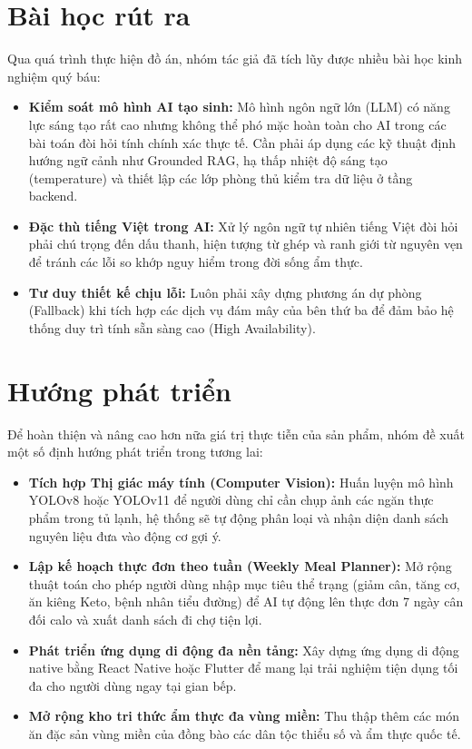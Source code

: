 \section{Bài học rút ra}

Qua quá trình thực hiện đồ án, nhóm tác giả đã tích lũy được nhiều bài học kinh nghiệm quý báu:
\begin{itemize}[leftmargin=1.6em, itemsep=2pt]
  \item \textbf{Kiểm soát mô hình AI tạo sinh:} Mô hình ngôn ngữ lớn (LLM) có năng lực sáng tạo rất cao nhưng không thể phó mặc hoàn toàn cho AI trong các bài toán đòi hỏi tính chính xác thực tế. Cần phải áp dụng các kỹ thuật định hướng ngữ cảnh như Grounded RAG, hạ thấp nhiệt độ sáng tạo (temperature) và thiết lập các lớp phòng thủ kiểm tra dữ liệu ở tầng backend.
  \item \textbf{Đặc thù tiếng Việt trong AI:} Xử lý ngôn ngữ tự nhiên tiếng Việt đòi hỏi phải chú trọng đến dấu thanh, hiện tượng từ ghép và ranh giới từ nguyên vẹn để tránh các lỗi so khớp nguy hiểm trong đời sống ẩm thực.
  \item \textbf{Tư duy thiết kế chịu lỗi:} Luôn phải xây dựng phương án dự phòng (Fallback) khi tích hợp các dịch vụ đám mây của bên thứ ba để đảm bảo hệ thống duy trì tính sẵn sàng cao (High Availability).
\end{itemize}

\section{Hướng phát triển}

Để hoàn thiện và nâng cao hơn nữa giá trị thực tiễn của sản phẩm, nhóm đề xuất một số định hướng phát triển trong tương lai:
\begin{itemize}[leftmargin=1.6em, itemsep=2pt]
  \item \textbf{Tích hợp Thị giác máy tính (Computer Vision):} Huấn luyện mô hình YOLOv8 hoặc YOLOv11 để người dùng chỉ cần chụp ảnh các ngăn thực phẩm trong tủ lạnh, hệ thống sẽ tự động phân loại và nhận diện danh sách nguyên liệu đưa vào động cơ gợi ý.
  \item \textbf{Lập kế hoạch thực đơn theo tuần (Weekly Meal Planner):} Mở rộng thuật toán cho phép người dùng nhập mục tiêu thể trạng (giảm cân, tăng cơ, ăn kiêng Keto, bệnh nhân tiểu đường) để AI tự động lên thực đơn 7 ngày cân đối calo và xuất danh sách đi chợ tiện lợi.
  \item \textbf{Phát triển ứng dụng di động đa nền tảng:} Xây dựng ứng dụng di động native bằng React Native hoặc Flutter để mang lại trải nghiệm tiện dụng tối đa cho người dùng ngay tại gian bếp.
  \item \textbf{Mở rộng kho tri thức ẩm thực đa vùng miền:} Thu thập thêm các món ăn đặc sản vùng miền của đồng bào các dân tộc thiểu số và ẩm thực quốc tế.
\end{itemize}
